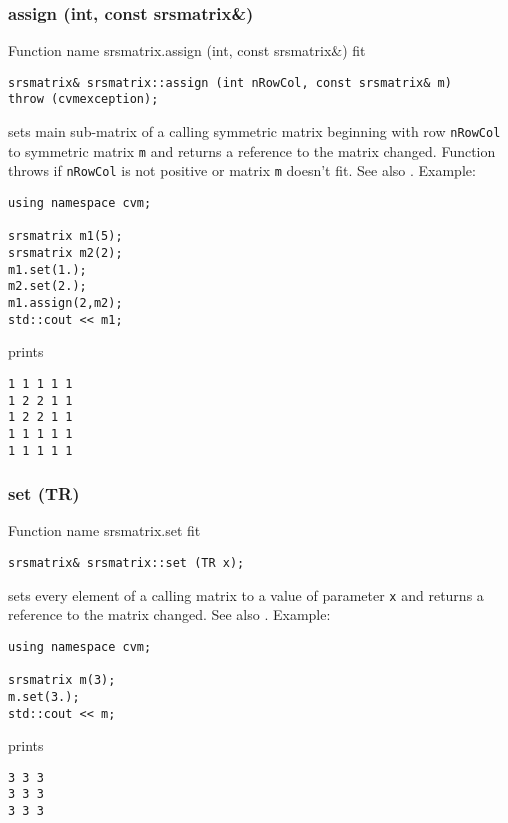 \subsubsection{assign (int, const srsmatrix\&)}
Function%
\pdfdest name {srsmatrix.assign (int, const srsmatrix&)} fit
\begin{verbatim}
srsmatrix& srsmatrix::assign (int nRowCol, const srsmatrix& m)
throw (cvmexception);
\end{verbatim}
sets main sub-matrix of a calling symmetric matrix beginning with \Based row
\verb"nRowCol" to  symmetric matrix \verb"m" and
returns a reference to the matrix changed.
Function throws 
  if \verb"nRowCol"
is not positive or matrix \verb"m" doesn't fit.
See also .
Example:
\begin{Verbatim}
using namespace cvm;

srsmatrix m1(5);
srsmatrix m2(2);
m1.set(1.);
m2.set(2.);
m1.assign(2,m2);
std::cout << m1;
\end{Verbatim}
prints
\begin{Verbatim}
1 1 1 1 1
1 2 2 1 1
1 2 2 1 1
1 1 1 1 1
1 1 1 1 1
\end{Verbatim}
\newpage







\subsubsection{set (TR)}
Function%
\pdfdest name {srsmatrix.set} fit
\begin{verbatim}
srsmatrix& srsmatrix::set (TR x);
\end{verbatim}
sets every element of a calling matrix to a value of
parameter \verb"x" and returns a reference to
the matrix changed.
See also .
Example:
\begin{Verbatim}
using namespace cvm;

srsmatrix m(3);
m.set(3.);
std::cout << m;
\end{Verbatim}
prints
\begin{Verbatim}
3 3 3
3 3 3
3 3 3
\end{Verbatim}
\newpage



